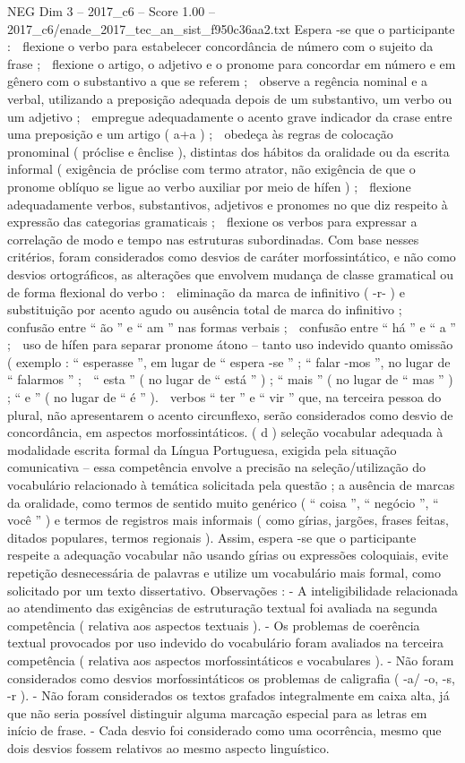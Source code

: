\begin{textsample}{NEG Dim 3 – 2017\_c6 – Score 1.00 – 2017\_c6/enade\_2017\_tec\_an\_sist\_f950c36aa2.txt}
Espera -se que o participante :  flexione o verbo para estabelecer concordância de número com o sujeito da frase ;  flexione o artigo, o adjetivo e o pronome para concordar em número e em gênero com o substantivo a que se referem ;  observe a regência nominal e a verbal, utilizando a preposição adequada depois de um substantivo, um verbo ou um adjetivo ;  empregue adequadamente o acento grave indicador da crase entre uma preposição e um artigo ( a+a ) ;  obedeça às regras de colocação pronominal ( próclise e ênclise ), distintas dos hábitos da oralidade ou da escrita informal ( exigência de próclise com termo atrator, não exigência de que o pronome oblíquo se ligue ao verbo auxiliar por meio de hífen ) ;  flexione adequadamente verbos, substantivos, adjetivos e pronomes no que diz respeito à expressão das categorias gramaticais ;  flexione os verbos para expressar a correlação de modo e tempo nas estruturas subordinadas.
Com base nesses critérios, foram considerados como desvios de caráter morfossintático, e não como desvios ortográficos, as alterações que envolvem mudança de classe gramatical ou de forma flexional do verbo :  eliminação da marca de infinitivo ( -r- ) e substituição por acento agudo ou ausência total de marca do infinitivo ;  confusão entre “ ão ” e “ am ” nas formas verbais ;  confusão entre “ há ” e “ a ” ;  uso de hífen para separar pronome átono – tanto uso indevido quanto omissão ( exemplo : “ esperasse ”, em lugar de “ espera -se ” ; “ falar -mos ”, no lugar de “ falarmos ” ;  “ esta ” ( no lugar de “ está ” ) ; “ mais ” ( no lugar de “ mas ” ) ; “ e ” ( no lugar de “ é ” ).  verbos “ ter ” e “ vir ” que, na terceira pessoa do plural, não apresentarem o acento circunflexo, serão considerados como desvio de concordância, em aspectos morfossintáticos. ( d ) seleção vocabular adequada à modalidade escrita formal da Língua Portuguesa, exigida pela situação comunicativa – essa competência envolve a precisão na seleção/utilização do vocabulário relacionado à temática solicitada pela questão ; a ausência de marcas da oralidade, como termos de sentido muito genérico ( “ coisa ”, “ negócio ”, “ você ” ) e termos de registros mais informais ( como gírias, jargões, frases feitas, ditados populares, termos regionais ).
Assim, espera -se que o participante respeite a adequação vocabular não usando gírias ou expressões coloquiais, evite repetição desnecessária de palavras e utilize um vocabulário mais formal, como solicitado por um texto dissertativo.
Observações : - A inteligibilidade relacionada ao atendimento das exigências de estruturação textual foi avaliada na segunda competência ( relativa aos aspectos textuais ). - Os problemas de coerência textual provocados por uso indevido do vocabulário foram avaliados na terceira competência ( relativa aos aspectos morfossintáticos e vocabulares ). - Não foram considerados como desvios morfossintáticos os problemas de caligrafia ( -a/ -o, -s, -r ). - Não foram considerados os textos grafados integralmente em caixa alta, já que não seria possível distinguir alguma marcação especial para as letras em início de frase. - Cada desvio foi considerado como uma ocorrência, mesmo que dois desvios fossem relativos ao mesmo aspecto linguístico.

\end{textsample}
